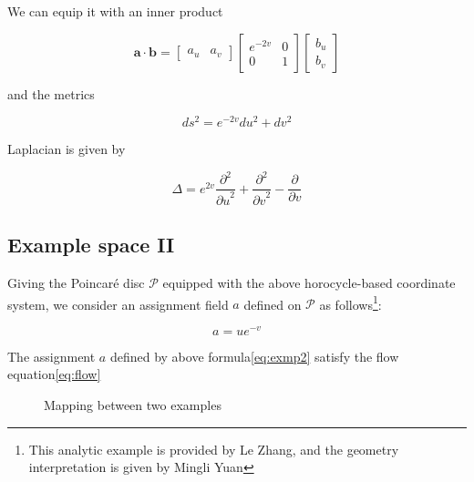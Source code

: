 We can equip it with an inner product

\[
\mathbf{a} \cdot \mathbf{b} = \begin{bmatrix} a_u & a_v \end{bmatrix} \begin{bmatrix} e^{-2v} & 0 \\ 0 & 1 \end{bmatrix} \begin{bmatrix} b_u \\ b_v \end{bmatrix}
\]

and the metrics

$$
ds^2 = e^{-2v} du^2 + dv^2
$$

Laplacian is given by\cite{Costa2001ADO}

$$
\Delta = e^{2v} \frac{\partial^2}{{\partial u}^2} + \frac{\partial^2}{{\partial v}^2} - \frac{\partial}{\partial v}
$$

\subsection{Example space II}\label{subsec:exmp2}

Giving the Poincaré disc $\mathcal{P}$ equipped with the above horocycle-based coordinate system,
we consider an assignment field $a$ defined on $\mathcal{P}$ as follows\footnote{This analytic example is provided by Le Zhang, and the geometry interpretation is given by Mingli Yuan}:

\begin{equation}\label{eq:exmp2}
a = u e^{-v}
\end{equation}

\begin{theorem}
The assignment $a$ defined by above formula\eqref{eq:exmp2} satisfy the flow equation\eqref{eq:flow}
\end{theorem}

\begin{figure}[ht]
\centering
{}
\caption{Mapping between two examples}\label{fig:mapping}
\end{figure}

